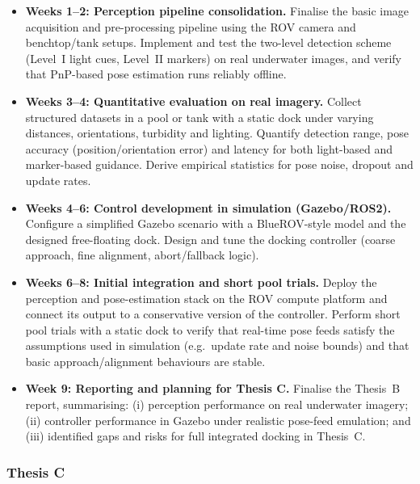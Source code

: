 \begin{itemize}
    \item \textbf{Weeks 1--2: Perception pipeline consolidation.}
          Finalise the basic image acquisition and pre-processing pipeline using the ROV camera and benchtop/tank setups. Implement and test the two-level detection scheme (Level~I light cues, Level~II markers) on real underwater images, and verify that PnP-based pose estimation runs reliably offline.

    \item \textbf{Weeks 3--4: Quantitative evaluation on real imagery.}
          Collect structured datasets in a pool or tank with a static dock under varying distances, orientations, turbidity and lighting. Quantify detection range, pose accuracy (position/orientation error) and latency for both light-based and marker-based guidance. Derive empirical statistics for pose noise, dropout and update rates.

    \item \textbf{Weeks 4--6: Control development in simulation (Gazebo/ROS2).}
          Configure a simplified Gazebo scenario with a BlueROV-style model and the designed free-floating dock. Design and tune the docking controller (coarse approach, fine alignment, abort/fallback logic).

    \item \textbf{Weeks 6--8: Initial integration and short pool trials.}
          Deploy the perception and pose-estimation stack on the ROV compute platform and connect its output to a conservative version of the controller. Perform short pool trials with a static dock to verify that real-time pose feeds satisfy the assumptions used in simulation (e.g.\ update rate and noise bounds) and that basic approach/alignment behaviours are stable.

    \item \textbf{Week 9: Reporting and planning for Thesis C.}
          Finalise the Thesis~B report, summarising: (i) perception performance on real underwater imagery; (ii) controller performance in Gazebo under realistic pose-feed emulation; and (iii) identified gaps and risks for full integrated docking in Thesis~C.
\end{itemize}

\subsubsection*{Thesis C}

